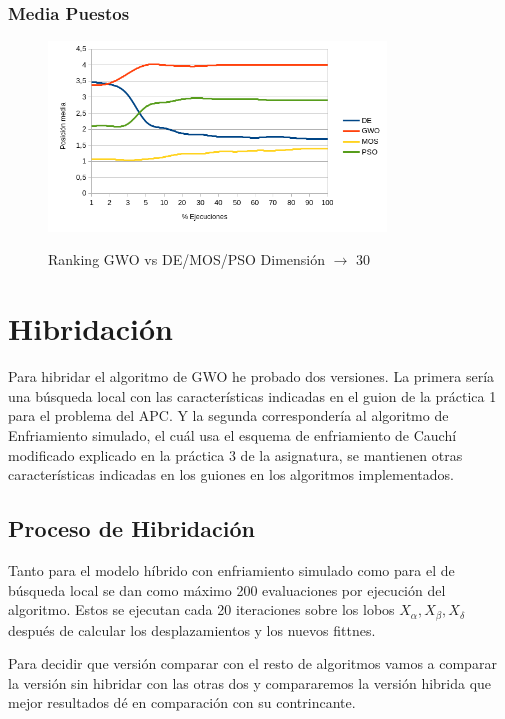 \documentclass[a4paper, 12.5pt]{report}
\begin{document}
\subsubsection*{Media Puestos}

\begin{figure}[H]
    \caption{Ranking GWO vs DE/MOS/PSO Dimensión $\rightarrow$ 30}
    \centering
    \includegraphics[width=0.8\textwidth]{Resultados/basico/d30/Grafico_puestos.png} \label{img:ranking_D30}
\end{figure}






\section{Hibridación }

Para hibridar el algoritmo de GWO he probado dos versiones. La primera sería una búsqueda local con las características indicadas en el guion de la práctica 1 para el problema del APC. Y la segunda correspondería al algoritmo de Enfriamiento simulado, el cuál usa el esquema de enfriamiento de Cauchí modificado explicado en la práctica 3 de la asignatura, se mantienen otras características indicadas en los guiones en los algoritmos implementados.



\subsection{Proceso de Hibridación}

Tanto para el modelo híbrido con enfriamiento simulado como para el de búsqueda local se dan como máximo 200 evaluaciones por ejecución del algoritmo. Estos se ejecutan cada 20 iteraciones sobre los lobos $X_\alpha,X_\beta,X_\delta$ después de calcular los desplazamientos y los nuevos fittnes.

Para decidir que versión comparar con el resto de algoritmos vamos a comparar la versión sin hibridar con las otras dos y compararemos la versión hibrida que mejor resultados dé en comparación con su contrincante.
\end{document}
